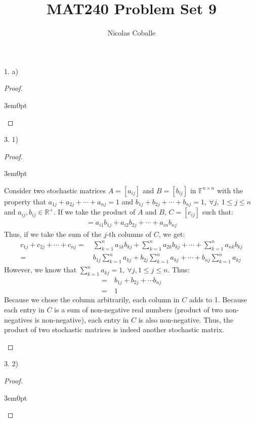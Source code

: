 \documentclass[11pt]{article}
\title{MAT240 Problem Set 9}
\author{Nicolas Coballe}
\newcommand{\R}{\mathbb{R}}
\newcommand{\F}{\mathbb{F}}
\newenvironment{myproof}
{\begin{proof} \begin{adjustwidth}{3em}{0pt}$ $\par\nobreak\ignorespaces}
{\end{adjustwidth} \end{proof}}
\begin{document}
\maketitle
\begin{flushleft}

1. a)

\begin{myproof}



\end{myproof}

\newpage

3. 1)

\begin{myproof}

Consider two stochastic matrices $A=[a_{ij}]$ and $B=[b_{ij}]$ in $\F^{n \times n}$ with the property that $a_{1j} + a_{2j} + \cdots + a_{nj} = 1$ and $b_{1j} + b_{2j} + \cdots + b_{nj} = 1, \ \forall j, \ 1 \leq j \leq n$ and $a_{ij}, b_{ij} \in \R^+$. If we take the product of $A$ and $B$, $C = [c_{ij}]$ such that:
\begin{align*}
[c_{ij}] = a_{i1}b_{1j} + a_{i2}b_{2j} + \cdots + a_{in}b_{nj}
\end{align*}
Thus, if we take the sum of the $j$-th columns of $C$, we get:
\begin{align*}
c_{1j} + c_{2j} + \cdots + c_{nj} = & \ \sum_{k = 1}^n a_{1k}b_{kj} + \sum_{k = 1}^n a_{2k}b_{kj} + \cdots + \sum_{k = 1}^n a_{nk}b_{kj} \\
= & \ b_{1j} \sum_{k = 1}^n a_{kj} + b_{2j} \sum_{k = 1}^n a_{kj} + \cdots + b_{nj} \sum_{k = 1}^n a_{kj}
\end{align*}
However, we know that $\sum_{k = 1}^n a_{kj} = 1, \ \forall j, 1 \leq j \leq n$. Thus:
\begin{align*}
= & \ b_{1j} + b_{2j} + \cdots b_{nj} \\
= & \ 1
\end{align*}
Because we chose the column arbitrarily, each column in $C$ adds to 1. Because each entry in $C$ is a sum of non-negative real numbers (product of two non-negatives is non-negative), each entry in $C$ is also non-negative. Thus, the product of two stochastic matrices is indeed another stochastic matrix.


\end{myproof}

3. 2)

\begin{myproof}

\newpage


\end{myproof}
\end{flushleft}
\end{document}
